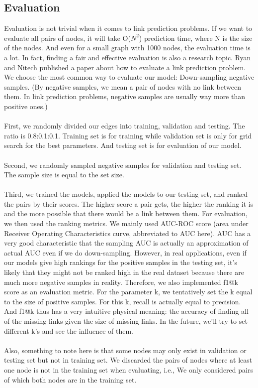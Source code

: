 \documentclass[12pt]{article}
\begin{document}
	\subsection{Evaluation}
	Evaluation is not trivial when it comes to link prediction problems. If we want to evaluate all pairs of nodes, it will take O($N^2$) prediction time, where N is the size of the nodes. And even for a small graph with 1000 nodes, the evaluation time is a lot. In fact, finding a fair and effective evaluation is also a research topic. Ryan and Nitech published a paper \cite{eval} about how to evaluate a link prediction problem. We choose the most common way to evaluate our model: Down-sampling negative samples. (By negative samples, we mean a pair of nodes with no link between them. In link prediction problems, negative samples are usually way more than positive ones.)
	\\
	\\
	First, we randomly divided our edges into training, validation and testing. The ratio is 0.8:0.1:0.1. Training set is for training while validation set is only for grid search for the best parameters. And testing set is for evaluation of our model. 
	\\
	\\
	Second, we randomly sampled negative samples for validation and testing set. The sample size is equal to the set size.
	\\
	\\
	Third, we trained the models, applied the models to our testing set, and ranked the pairs by their scores. The higher score a pair gets, the higher the ranking it is and the more possible that there would be a link between them. For evaluation, we then used the ranking metrics. We mainly used AUC-ROC score (area under Receiver Operating Characteristics curve, abbreviated to AUC here). AUC has a very good characteristic that the sampling AUC is actually an approximation of actual AUC even if we do down-sampling. However, in real applications, even if our models give high rankings for the positive samples in the testing set, it's likely that they might not be ranked high in the real dataset because there are much more negative samples in reality. Therefore, we also implemented f1@k score as an evaluation metric. For the parameter k, we tentatively set the k equal to the size of positive samples. For this k, recall is actually equal to precision. And f1@k thus has a very intuitive physical meaning: the accuracy of finding all of the missing links given the size of missing links. In the future, we'll try to set different k's and see the influence of them. 
	\\
	\\
	Also, something to note here is that some nodes may only exist in validation or testing set but not in training set. We discarded the pairs of nodes where at least one node is not in the training set when evaluating, i.e., We only considered pairs of which both nodes are in the training set.
	
\end{document}
